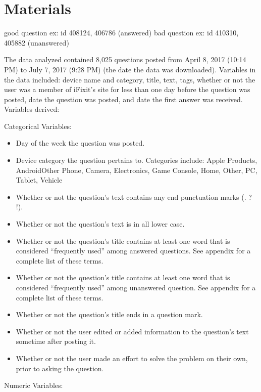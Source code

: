 \documentclass{article}
\begin{document}

\section*{Materials}

good question ex: id 408124, 406786 (answered)
bad question ex: id 410310, 405882 (unanswered) 

The data analyzed contained 8,025 questions posted from April 8, 2017 (10:14 PM) to July 7, 2017 (9:28 PM) (the date the data was downloaded). Variables in the data included: device name and category, title, text, tags, whether or not the user was a member of iFixit's site for less than one day before the question was posted, date the question was posted, and date the first answer was received. Variables derived: 

Categorical Variables: 

\begin{itemize}
  \item Day of the week the question was posted. 
  \item Device category the question pertains to. Categories include: Apple Products, Android\/Other Phone, Camera, Electronics, Game Console, Home, Other, PC, Tablet, Vehicle
  \item Whether or not the question's text contains any end punctuation marks (. ? !). 
  \item Whether or not the question's text is in all lower case. 
  \item Whether or not the question's title contains at least one word that is considered ``frequently used'' among answered questions. See appendix for a complete list of these terms. 
  \item Whether or not the question's title contains at least one word that is considered ``frequently used'' among unanswered question. See appendix for a complete list of these terms. 
  \item Whether or not the question's title ends in a question mark.
  \item Whether or not the user edited or added information to the question's text sometime after posting it.
  \item Whether or not the user made an effort to solve the problem on their own, prior to asking the question.
\end{itemize}

Numeric Variables:
\end{document}
